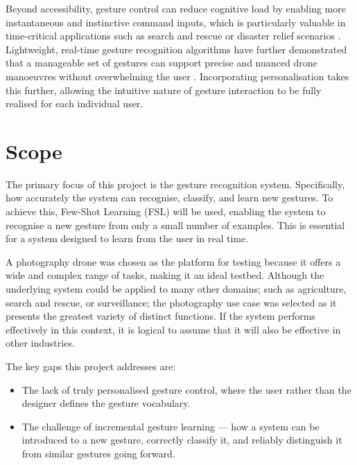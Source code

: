 Beyond accessibility, gesture control can reduce cognitive load by enabling more instantaneous and instinctive command inputs, which is particularly valuable in time-critical applications such as search and rescue or disaster relief scenarios \citep{Kumar2020}. Lightweight, real-time gesture recognition algorithms have further demonstrated that a manageable set of gestures can support precise and nuanced drone manoeuvres without overwhelming the user \citep{Yun2024}. Incorporating personalisation takes this further, allowing the intuitive nature of gesture interaction to be fully realised for each individual user.

\section{Scope}

The primary focus of this project is the gesture recognition system. Specifically, how accurately the system can recognise, classify, and learn new gestures. To achieve this, Few-Shot Learning (FSL) will be used, enabling the system to recognise a new gesture from only a small number of examples. This is essential for a system designed to learn from the user in real time.

A photography drone was chosen as the platform for testing because it offers a wide and complex range of tasks, making it an ideal testbed. Although the underlying system could be applied to many other domains; such as agriculture, search and rescue, or surveillance; the photography use case was selected as it presents the greatest variety of distinct functions. If the system performs effectively in this context, it is logical to assume that it will also be effective in other industries.

The key gaps this project addresses are:
\begin{itemize}
    \item The lack of truly personalised gesture control, where the user rather than the designer defines the gesture vocabulary.
    \item The challenge of incremental gesture learning — how a system can be introduced to a new gesture, correctly classify it, and reliably distinguish it from similar gestures going forward.
\end{itemize}